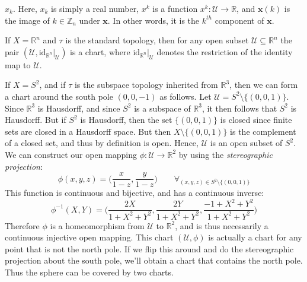 \documentclass{article}                                                        %
\begin{document}
        $x_{k}$. Here, $x_{k}$ is simply a real number, $x^{k}$ is a function
        $x^{k}:\mathcal{U}\rightarrow\mathbb{R}$, and $\mathbf{x}(k)$ is the
        image of $k\in\mathbb{Z}_{n}$ under $\mathbf{x}$. In other words, it is
        the $k^{th}$ component of $\mathbf{x}$.
        \begin{example}
            If $X=\mathbb{R}^{n}$ and $\tau$ is the standard topology, then
            for any open subset $\mathcal{U}\subseteq\mathbb{R}^{n}$ the
            pair $(\mathcal{U},\textrm{id}_{\mathbb{R}^{n}}|_{\mathcal{U}})$
            is a chart, where $\textrm{id}_{\mathbb{R}^{n}}|_{\mathcal{U}}$
            denotes the restriction of the identity map to $\mathcal{U}$.
        \end{example}
        \begin{example}
            If $X=S^{2}$, and if $\tau$ is the subspace topology inherited
            from $\mathbb{R}^{3}$, then we can form a chart around the
            south pole $(0,0,\minus{1})$ as follows. Let
            $\mathcal{U}=S^{2}\setminus\{(0,0,1)\}$. Since $\mathbb{R}^{3}$
            is Hausdorff, and since $S^{2}$ is a subspace of
            $\mathbb{R}^{3}$, it then follows that $S^{2}$ is Hausdorff. But
            if $S^{2}$ is Hausdorff, then the set $\{(0,0,1)\}$ is closed
            since finite sets are closed in a Hausdorff space. But then
            $X\setminus\{(0,0,1)\}$ is the complement of a closed set, and
            thus by definition is open. Hence, $\mathcal{U}$ is an open
            subset of $S^{2}$. We can construct our open mapping
            $\phi:\mathcal{U}\rightarrow\mathbb{R}^{2}$ by using the
            \textit{stereographic projection}:
            \begin{equation}
                \phi(x,y,z)=\Big(\frac{x}{1-z},\frac{y}{1-z}\Big)
                \quad\quad
                \forall_{(x,y,z)\in{S}^{2}\setminus\{(0,0,1)\}}
            \end{equation}
            This function is continuous and bijective, and has a continuous
            inverse:
            \begin{equation}
                \phi^{\minus{1}}(X,Y)=
                \Big(\frac{2X}{1+X^{2}+Y^{2}},\frac{2Y}{1+X^{2}+Y^{2}},
                    \frac{\minus{1}+X^{2}+Y^{2}}{1+X^{2}+Y^{2}}\Big)
            \end{equation}
            Therefore $\phi$ is a homeomorphism from $\mathcal{U}$ to
            $\mathbb{R}^{2}$, and is thus necessarily a continuous injective
            open mapping. This chart $(\mathcal{U},\phi)$ is actually a
            chart for any point that is not the north pole. If we flip this
            around and do the stereographic projection about the south pole,
            we'll obtain a chart that contains the north pole. Thus the
            sphere can be covered by two charts.
        \end{example}
\end{document}
